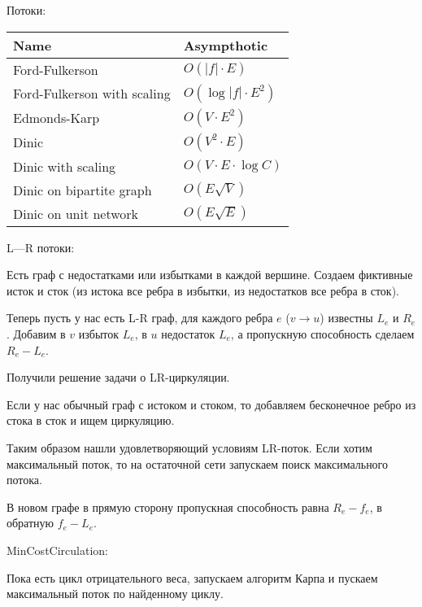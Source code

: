 Потоки:
\begin{table}[H]
\centering
\begin{tabular}{|l|l|}
	\hline
	Name                        & Asympthotic                 \\ \hline
	Ford-Fulkerson              & $O(|f| \cdot E)$            \\ \hline
	Ford-Fulkerson with scaling & $O(\log |f| \cdot E^2)$     \\ \hline
	Edmonds-Karp                & $O(V \cdot E^2)$            \\ \hline
	Dinic                       & $O(V^2\cdot E)$             \\ \hline
	Dinic with scaling          & $O(V \cdot E \cdot \log C)$ \\ \hline
	Dinic on bipartite graph    & $O(E \sqrt{V})$             \\ \hline
	Dinic on unit network       & $O(E \sqrt{E})$             \\ \hline
\end{tabular}
\end{table}

L---R потоки:

Есть граф с недостатками или избытками в каждой вершине. Создаем фиктивные исток и сток (из истока все ребра в избытки, из недостатков все ребра в сток).

Теперь пусть у нас есть L-R граф, для каждого ребра $e$ ($v \rightarrow u$) известны $L_e$ и $R_e$. Добавим в $v$ избыток $L_e$, в $u$ недостаток $L_e$, 
а пропускную способность сделаем $R_e - L_e$.

Получили решение задачи о LR-циркуляции.

Если у нас обычный граф с истоком и стоком, то добавляем бесконечное ребро из стока в сток и ищем циркуляцию.

Таким образом нашли удовлетворяющий условиям LR-поток. Если хотим максимальный поток, то на остаточной сети запускаем поиск максимального потока.

В новом графе в прямую сторону пропускная способность равна $R_e - f_e$, в обратную $f_e - L_e$.


MinCostCirculation:

Пока есть цикл отрицательного веса, запускаем алгоритм Карпа и пускаем максимальный поток по найденному циклу.

